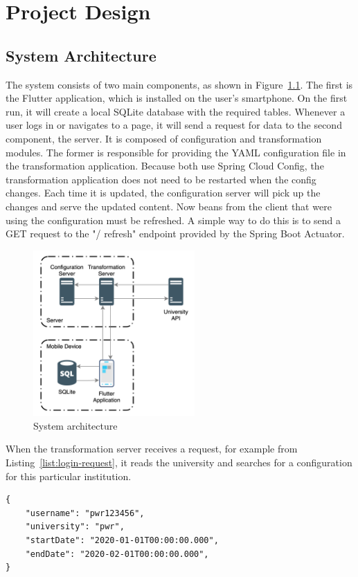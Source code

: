 \chapter{Project Design}
\section{System Architecture}

The system consists of two main components, as shown in Figure~\ref{fig:sys-architecture}. The first is the Flutter application, which is installed on the user's smartphone. On the first run, it will create a local SQLite database with the required tables. Whenever a user logs in or navigates to a page, it will send a request for data to the second component, the server. It is composed of configuration and transformation modules. The former is responsible for providing the YAML configuration file in the transformation application. Because both use Spring Cloud Config, the transformation application does not need to be restarted when the config changes. Each time it is updated, the configuration server will pick up the changes and serve the updated content. Now beans from the client that were using the configuration must be refreshed. A simple way to do this is to send a GET request to the "/ refresh" endpoint provided by the Spring Boot Actuator.

\begin{figure}[htb]
    \centering
    \includegraphics[width=0.55\textwidth]{fig03/system_architecture.png}
    \caption{System architecture}
    \label{fig:sys-architecture}
\end{figure}

When the transformation server receives a request, for example from Listing~\ref{list:login-request}, it reads the university and searches for a configuration for this particular institution.
\begin{lstlisting}[label=list:login-request,caption=Sample calendar request]
{
    "username": "pwr123456",
    "university": "pwr",
    "startDate": "2020-01-01T00:00:00.000",
    "endDate": "2020-02-01T00:00:00.000",
}
\end{lstlisting}

